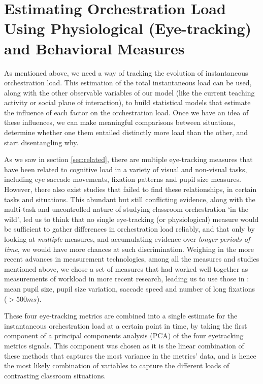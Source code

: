 \documentclass[10pt,journal,compsoc]{IEEEtran}
\begin{document}
\section{Estimating Orchestration Load Using Physiological (Eye-tracking) and Behavioral Measures}
\label{sec:measures}

As mentioned above, we need a way of tracking the evolution of instantaneous orchestration load. This estimation of the total instantaneous load can be used, along with the other observable variables of our model (like the current teaching activity or social plane of interaction), to build statistical models that estimate the influence of each factor on the orchestration load. Once we have an idea of these influences, we can make meaningful comparisons between situations, determine whether one them entailed distinctly more load than the other, and start disentangling why.

As we saw in section \ref{sec:related}, there are multiple eye-tracking measures that have been related to cognitive load in a variety of visual and non-visual tasks, including eye saccade movements,  %
fixation patterns %
and pupil size measures. %
However, there also exist studies that failed to find these relationships, in certain tasks and situations. %
This abundant but still conflicting evidence, along with the multi-task and uncontrolled nature of studying classroom orchestration `in the wild', led us to think that no single eye-tracking (or physiological) measure would be sufficient to gather differences in orchestration load reliably, and that only by looking at \textit{multiple} measures, and accumulating evidence over \textit{longer periods of time}, we would have more chances at such discrimination. Weighing in the more recent advances in measurement technologies, among all the measures and studies mentioned above, we chose a set of measures that had worked well together as measurements of workload in more recent research, leading us to use those in \cite{Buettner2013}: mean pupil size, pupil size variation, saccade speed and number of long fixations ($>500ms$). 

These four eye-tracking metrics are combined into a single estimate for the instantaneous orchestration load at a certain point in time, by taking the first component of a principal components analysis (PCA) of the four eyetracking metrics signals. This component was chosen as it is the linear combination of these methods that captures the most variance in the metrics' data, and is hence the most likely combination of variables to capture the different loads of contrasting classroom situations.
\end{document}
